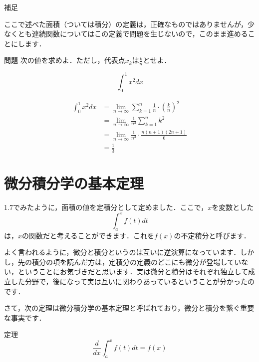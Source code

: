 \documentclass[
  b4paperpaper,
  xelatex,ja=standard]{bxjsbook}
\begin{document}
補足

ここで述べた面積（ついては積分）の定義は，正確なものではありませんが，少なくとも連続関数についてはこの定義で問題を生じないので，このまま進めることにします．

\begin{Qbox}{問題}
次の値を求めよ．ただし，代表点\(x_k\)は\(\displaystyle\frac{k}{n}\)とせよ．

\[\displaystyle\int_{0}^{1} x^2dx\]

\end{Qbox}


\begin{align*}
\displaystyle\int_{0}^{1} x^2dx　&= \displaystyle\lim_{n\to\infty} \displaystyle\sum_{k=1}^{n}\displaystyle\frac{1}{n}\cdot \left(\displaystyle\frac{k}{n}\right)^2\\
&=\displaystyle\lim_{n\to\infty}\displaystyle\frac{1}{n^3}\displaystyle\sum_{k=1}^{n}k^2\\
&=\displaystyle\lim_{n\to\infty}\displaystyle\frac{1}{n^3}\cdot \displaystyle\frac{n(n+1)(2n+1)}{6}\\
&=\displaystyle\frac{1}{3}
\end{align*}

\hypertarget{ux5faeux5206ux7a4dux5206ux5b66ux306eux57faux672cux5b9aux7406}{%
\section{微分積分学の基本定理}\label{ux5faeux5206ux7a4dux5206ux5b66ux306eux57faux672cux5b9aux7406}}

1.7でみたように，面積の値を定積分として定めました．ここで，\(x\)を変数とした
\[\displaystyle\int_{a}^{x}f(t)dt\]
は，\(x\)の関数だと考えることができます．これを\(f(x)\)の不定積分と呼びます．

よく言われるように，微分と積分というのは互いに逆演算になっています．しかし，先の積分の項を読んだ方は，定積分の定義のどこにも微分が登場していない，ということにお気づきだと思います．実は微分と積分はそれぞれ独立して成立した分野で，後になって実は互いに関わりあっているということが分かったのです．

さて，次の定理は微分積分学の基本定理と呼ばれており，微分と積分を繋ぐ重要な事実です．

\begin{Tbox}{定理}
\[\displaystyle\frac{d}{dx}\displaystyle\int_{a}^{x}f(t)dt=f(x)\]

\end{Tbox}
\end{document}
